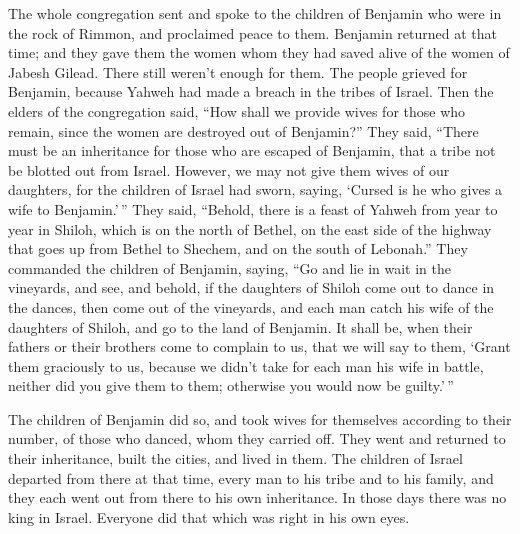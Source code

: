  The whole congregation sent and spoke to the children of
Benjamin who were in the rock of Rimmon, and proclaimed peace to them.
 Benjamin returned at that time; and they gave them the
women whom they had saved alive of the women of Jabesh Gilead. There
still weren't enough for them.  The people grieved for
Benjamin, because Yahweh had made a breach in the tribes of Israel.
 Then the elders of the congregation said, ``How shall we
provide wives for those who remain, since the women are destroyed out of
Benjamin?''  They said, ``There must be an inheritance
for those who are escaped of Benjamin, that a tribe not be blotted out
from Israel.  However, we may not give them wives of our
daughters, for the children of Israel had sworn, saying, `Cursed is he
who gives a wife to Benjamin.'\,''  They said, ``Behold,
there is a feast of Yahweh from year to year in Shiloh, which is on the
north of Bethel, on the east side of the highway that goes up from
Bethel to Shechem, and on the south of Lebonah.''  They
commanded the children of Benjamin, saying, ``Go and lie in wait in the
vineyards,  and see, and behold, if the daughters of
Shiloh come out to dance in the dances, then come out of the vineyards,
and each man catch his wife of the daughters of Shiloh, and go to the
land of Benjamin.  It shall be, when their fathers or
their brothers come to complain to us, that we will say to them, `Grant
them graciously to us, because we didn't take for each man his wife in
battle, neither did you give them to them; otherwise you would now be
guilty.'\,''

 The children of Benjamin did so, and took wives for
themselves according to their number, of those who danced, whom they
carried off. They went and returned to their inheritance, built the
cities, and lived in them.  The children of Israel
departed from there at that time, every man to his tribe and to his
family, and they each went out from there to his own inheritance.
 In those days there was no king in Israel. Everyone did
that which was right in his own eyes.
